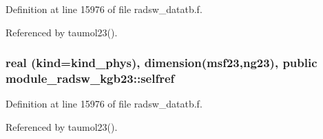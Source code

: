 Definition at line 15976 of file radsw\+\_\+datatb.\+f.



Referenced by taumol23().

\subsubsection[{\texorpdfstring{selfref}{selfref}}]{\setlength{\rightskip}{0pt plus 5cm}real (kind=kind\+\_\+phys), dimension({\bf msf23},ng23), public module\+\_\+radsw\+\_\+kgb23\+::selfref}\hypertarget{namespacemodule__radsw__kgb23_ae4e51bcb3c3cbaaf1476d5ab18b072e5}{}\label{namespacemodule__radsw__kgb23_ae4e51bcb3c3cbaaf1476d5ab18b072e5}


Definition at line 15976 of file radsw\+\_\+datatb.\+f.



Referenced by taumol23().


